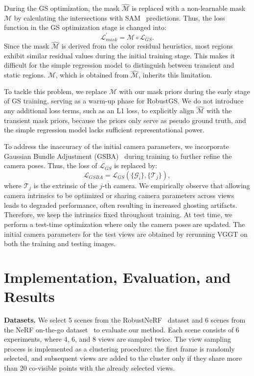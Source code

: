 \documentclass[letterpaper, 10 pt, conference]{ieeeconf}  %
\begin{document}
During the GS optimization, the mask $\hat{\mathcal{M}}$ is replaced with a non-learnable mask $\mathcal{M}$ by calculating the intersections with SAM~\cite{kirillov2023segment} predictions. Thus, the loss function in the GS optimization stage is changed into:
\begin{equation}
    \mathcal{L}^{\prime}_{mask} = \mathcal{M} \circ \mathcal{L}_{GS}.
\end{equation}
Since the mask $\hat{\mathcal{M}}$ is derived from the color residual heuristics, most regions exhibit similar residual values during the initial training stage. This makes it difficult for the simple regression model to distinguish between transient and static regions. $\mathcal{M}$, which is obtained from $\hat{\mathcal{M}}$, inherits this limitation. 

To tackle this problem, we replace $\mathcal{M}$ with our mask priors during the early stage of GS training, serving as a warm-up phase for RobustGS. We do not introduce any additional loss terms, such as an L1 loss, to explicitly align $\hat{\mathcal{M}}$ with the transient mask priors, because the priors only serve as pseudo ground truth, and the simple regression model lacks sufficient representational power.

To address the inaccuracy of the initial camera parameters, we incorporate Gaussian Bundle Adjustment (GSBA)~\cite{fan2024instantsplat} during training to further refine the camera poses. Thus, the loss of $\mathcal{L}_{GS}$ is replaced by:
\begin{equation}
    \mathcal{L}_{GSBA} = \mathcal{L}_{GS}(\{\mathcal G_i\}, \{\mathcal T_j\}),
\end{equation}
where $\mathcal T_j$ is the extrinsic of the $j$-th camera. We empirically observe that allowing camera intrinsics to be optimized or sharing camera parameters across views leads to degraded performance, often resulting in increased ghosting artifacts. Therefore, we keep the intrinsics fixed throughout training. At test time, we perform a test-time optimization where only the camera poses are updated. The initial camera parameters for the test views are obtained by rerunning VGGT on both the training and testing images.



% 

\section{Implementation, Evaluation, and Results}
\noindent
\textbf{Datasets.} We select 5 scenes from the RobustNeRF~\cite{sabour2023robustnerf} dataset and 6 scenes from the NeRF on-the-go dataset~\cite{Ren2024NeRF} to evaluate our method. Each scene consists of 6 experiments, where 4, 6, and 8 views are sampled twice. The view sampling process is implemented as a clustering procedure: the first frame is randomly selected, and subsequent views are added to the cluster only if they share more than 20 co-visible points with the already selected views.
\end{document}

